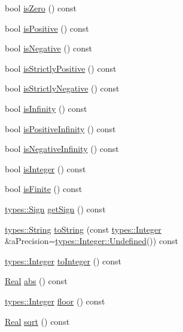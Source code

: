\begin{DoxyCompactItemize}
\item 
bool \hyperlink{classlibrary_1_1core_1_1types_1_1_real_a7f9a08009b4d5033ff8c9eaa4a6b2c7e}{is\+Zero} () const
\item 
bool \hyperlink{classlibrary_1_1core_1_1types_1_1_real_af2ace2b52781a5e537daef7e6cee6df3}{is\+Positive} () const
\item 
bool \hyperlink{classlibrary_1_1core_1_1types_1_1_real_aa12d6c4d50c80dc184e34d6e52c9dd10}{is\+Negative} () const
\item 
bool \hyperlink{classlibrary_1_1core_1_1types_1_1_real_ac96efb831bb08fd5cfe0f8cfc18ee6b1}{is\+Strictly\+Positive} () const
\item 
bool \hyperlink{classlibrary_1_1core_1_1types_1_1_real_a91029945199886cd83279f29cc225b91}{is\+Strictly\+Negative} () const
\item 
bool \hyperlink{classlibrary_1_1core_1_1types_1_1_real_a4603222d9315aa59355778d66c0b214d}{is\+Infinity} () const
\item 
bool \hyperlink{classlibrary_1_1core_1_1types_1_1_real_a432e5a765554e8656e9bcb6d54f1553d}{is\+Positive\+Infinity} () const
\item 
bool \hyperlink{classlibrary_1_1core_1_1types_1_1_real_a5d7286e45a9f05cda79402c9d8efbc13}{is\+Negative\+Infinity} () const
\item 
bool \hyperlink{classlibrary_1_1core_1_1types_1_1_real_ad2709f64d24cb119403a0a6d386f5eda}{is\+Integer} () const
\item 
bool \hyperlink{classlibrary_1_1core_1_1types_1_1_real_a3355dd60d401e1f464d0bc20be9a32d5}{is\+Finite} () const
\item 
\hyperlink{namespacelibrary_1_1core_1_1types_a06d9eaa410d43a0fa3f383040618e87d}{types\+::\+Sign} \hyperlink{classlibrary_1_1core_1_1types_1_1_real_a0e92ad5d5a946dcc64385e1bf47003c8}{get\+Sign} () const
\item 
\hyperlink{classlibrary_1_1core_1_1types_1_1_string}{types\+::\+String} \hyperlink{classlibrary_1_1core_1_1types_1_1_real_a5d2632591e723b672323c60f1f4ec0be}{to\+String} (const \hyperlink{classlibrary_1_1core_1_1types_1_1_integer}{types\+::\+Integer} \&a\+Precision=\hyperlink{classlibrary_1_1core_1_1types_1_1_integer_a142c2df49031b787daf30673c73fcad7}{types\+::\+Integer\+::\+Undefined}()) const
\item 
\hyperlink{classlibrary_1_1core_1_1types_1_1_integer}{types\+::\+Integer} \hyperlink{classlibrary_1_1core_1_1types_1_1_real_aa4a7f3663994b5e59dc894b80856e0fb}{to\+Integer} () const
\item 
\hyperlink{classlibrary_1_1core_1_1types_1_1_real}{Real} \hyperlink{classlibrary_1_1core_1_1types_1_1_real_aca1aed64224745a0aa2fcf93c6faa0f9}{abs} () const
\item 
\hyperlink{classlibrary_1_1core_1_1types_1_1_integer}{types\+::\+Integer} \hyperlink{classlibrary_1_1core_1_1types_1_1_real_ab25f3250b107fda48e86964792854b94}{floor} () const
\item 
\hyperlink{classlibrary_1_1core_1_1types_1_1_real}{Real} \hyperlink{classlibrary_1_1core_1_1types_1_1_real_a7cb7843b8dc0c2e2b69322dd66caabc0}{sqrt} () const
\end{DoxyCompactItemize}
